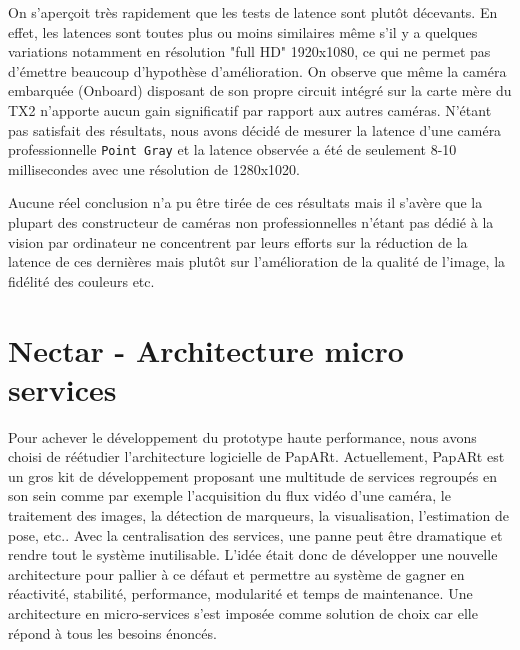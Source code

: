 \begin{table}[H]
\centering
\caption{Latence (en ms) de plusieurs caméras mesurée en Glass to glass - NVIDIA Jetson TX2}
\label{fig:latency:camera}
\end{table}

On s'aperçoit très rapidement que les tests de latence sont plutôt décevants. En effet, les latences sont toutes plus ou moins similaires même s'il y a quelques variations notamment en résolution "full HD" 1920x1080, ce qui ne permet pas d'émettre beaucoup d'hypothèse d'amélioration. On observe que même la caméra embarquée (Onboard) disposant de son propre circuit intégré sur la carte mère du TX2 n'apporte aucun gain significatif par rapport aux autres caméras.
N'étant pas satisfait des résultats, nous avons décidé de mesurer la latence d'une caméra professionnelle \texttt{Point Gray} et la latence observée a été de seulement 8-10 millisecondes avec une résolution de 1280x1020. 

Aucune réel conclusion n'a pu être tirée de ces résultats mais il s'avère que la plupart des constructeur de caméras non professionnelles n'étant pas dédié à la vision par ordinateur ne concentrent par leurs efforts sur la réduction de la latence de ces dernières mais plutôt sur l'amélioration de la qualité de l'image, la fidélité des couleurs etc.

\newpage
\section{Nectar - Architecture micro services}
\label{sec:nectararchi}

Pour achever le développement du prototype haute performance, nous avons choisi de réétudier l'architecture logicielle de PapARt. 
Actuellement, PapARt est un gros kit de développement proposant une multitude de services regroupés en son sein comme par exemple l'acquisition du flux vidéo d'une caméra, le traitement des images, la détection de marqueurs, la visualisation, l'estimation de pose, etc.. Avec la centralisation des services, une panne peut être dramatique et rendre tout le système inutilisable. L'idée était donc de développer une nouvelle architecture pour pallier à ce défaut et permettre au système de gagner en réactivité, stabilité, performance, modularité et temps de maintenance. Une architecture en micro-services s'est imposée comme solution de choix car elle répond à tous les besoins énoncés.

